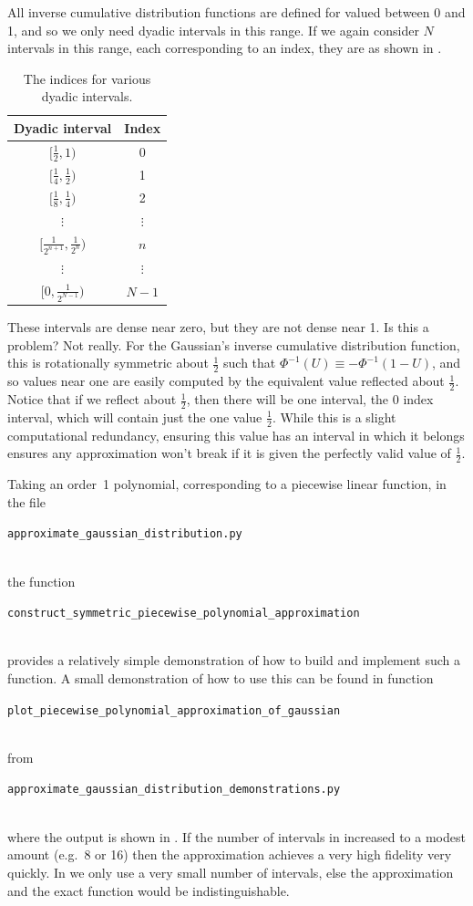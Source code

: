 \documentclass[11pt,a4paper,twoside,english]{extarticle}
\newcommand{\singlecodeline}[1]{\\[1em]\centerline{\lstinline[basicstyle=\ttfamily]$#1$}\\[1em]}
\begin{document}
All inverse cumulative distribution functions are defined for valued between 0 and 1, and so we only need dyadic intervals in this range. If we again consider $ N $ intervals in this range, each corresponding to an index, they are as shown in .

\begin{table}[htb]
\centering
\begin{tabular}{cc}
Dyadic interval         & Index \\ \hline
$ [\tfrac{1}{2}, 1) $           &          0           \\
$ [\tfrac{1}{4}, \tfrac{1}{2}) $     &          1           \\
$ [\tfrac{1}{8}, \tfrac{1}{4}) $     &          2           \\
$ \vdots $                &      $ \vdots $      \\
$ [\tfrac{1}{2^{n+1}}, \tfrac{1}{2^n}) $ &        $ n $ \\
$ \vdots $                &      $ \vdots $      \\
$ [0, \tfrac{1}{2^{N-1}}) $ &        $ N-1 $
\end{tabular}
\caption{The indices for various dyadic intervals.}
\label{tab:dyadic_intervals_array_indices}
\end{table}

These intervals are dense near zero, but they are not dense near 1. Is this a problem? Not really. For the Gaussian's inverse cumulative distribution function, this is rotationally symmetric about $ \tfrac{1}{2} $ such that $ \Phi^{-1}(U) \equiv -\Phi^{-1}(1-U) $, and so values near one are easily computed by the equivalent value reflected about $ \tfrac{1}{2} $. Notice that if we reflect about $ \tfrac{1}{2} $, then there will be one interval, the 0 index interval, which will contain just the one value $ \tfrac{1}{2} $. While this is a slight computational redundancy, ensuring this value has an interval in which it belongs ensures any approximation won't break if it is given the perfectly valid value of $ \tfrac{1}{2} $.

Taking an order~1 polynomial, corresponding to a piecewise linear function, in the file \singlecodeline{approximate_gaussian_distribution.py} the function \singlecodeline{construct_symmetric_piecewise_polynomial_approximation} provides a relatively simple demonstration of how to build and implement such a function. A small demonstration of how to use this can be found in function \singlecodeline{plot_piecewise_polynomial_approximation_of_gaussian} from \singlecodeline{approximate_gaussian_distribution_demonstrations.py}
where the output is shown in . If the number of intervals in increased to a modest amount (e.g.~8 or 16) then the approximation achieves a very high fidelity very quickly. In  we only use a very small number of intervals, else the approximation and the exact function would be indistinguishable.
\end{document}
